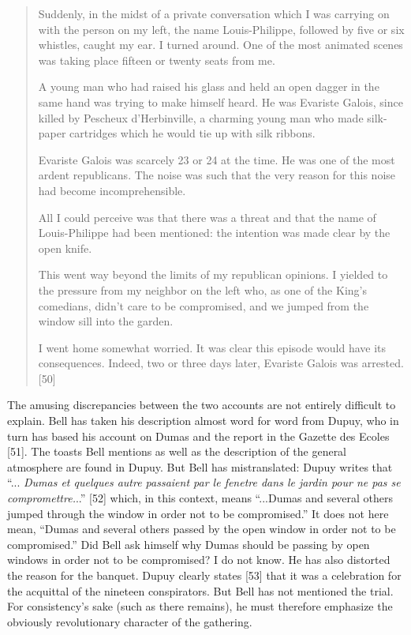 \documentclass[12pt]{article}
\begin{document}
\begin{quotation}
Suddenly, in the midst of a private conversation which I was carrying on with the person on my left, the name Louis-Philippe, followed by five or six whistles, caught my ear. I turned around. One of the most animated scenes was taking place fifteen or twenty seats from me.

A young man who had raised his glass and held an open dagger in the same hand was trying to make himself heard. He was Evariste Galois, since killed by Pescheux d'Herbinville, a charming young man who made silk-paper cartridges which he would tie up with silk ribbons.

Evariste Galois was scarcely 23 or 24 at the time. He was one of the most ardent republicans. The noise was such that the very reason for this noise had become incomprehensible. 

All I could perceive was that there was a threat and that the name of Louis-Philippe had been mentioned: the intention was made clear by the open knife. 

This went way beyond the limits of my republican opinions. I yielded to the pressure from my neighbor on the left who, as one of the King's comedians, didn't care to be compromised, and we jumped from the window sill into the garden. 

I went home somewhat worried. It was clear this episode would have its consequences. Indeed, two or three days later, Evariste Galois was arrested. [50]
\end{quotation}

The amusing discrepancies between the two accounts are not entirely difficult to explain. Bell has taken his description almost word for word from Dupuy, who in turn has based his account on Dumas and the report in the Gazette des Ecoles [51]. The toasts Bell mentions as well as the description of the general atmosphere are found in Dupuy. But Bell has mistranslated: Dupuy writes that ``... \emph{Dumas et quelques autre passaient par le fenetre dans le jardin pour ne pas se compromettre.}..'' [52] which, in this context, means ``...Dumas and several others jumped through the window in order not to be compromised.'' It does not here mean, ``Dumas and several others passed by the open window in order not to be compromised.'' Did Bell ask himself why Dumas should be passing by open windows in order not to be compromised? I do not know. He has also distorted the reason for the banquet. Dupuy clearly states [53] that it was a celebration for the acquittal of the nineteen conspirators. But Bell has not mentioned the trial. For consistency's sake (such as there remains), he must therefore emphasize the obviously revolutionary character of the gathering.
\end{document}
